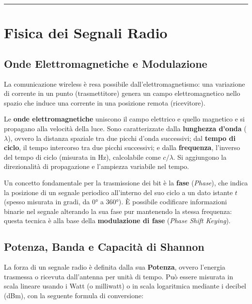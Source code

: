 \documentclass[
  italian,
  openany]{book}
\begin{document}
\begin{center}\rule{0.5\linewidth}{0.5pt}\end{center}

\section{Fisica dei Segnali Radio}\label{fisica-dei-segnali-radio}

\subsection{Onde Elettromagnetiche e
Modulazione}\label{onde-elettromagnetiche-e-modulazione}

La comunicazione wireless è resa possibile dall'elettromagnetismo: una
variazione di corrente in un punto (trasmettitore) genera un campo
elettromagnetico nello spazio che induce una corrente in una posizione
remota (ricevitore).

Le \textbf{onde elettromagnetiche} uniscono il campo elettrico e quello
magnetico e si propagano alla velocità della luce. Sono caratterizzate
dalla \textbf{lunghezza d'onda} (\(\lambda\)), ovvero la distanza
spaziale tra due picchi d'onda successivi; dal \textbf{tempo di ciclo},
il tempo intercorso tra due picchi successivi; e dalla
\textbf{frequenza}, l'inverso del tempo di ciclo (misurata in Hz),
calcolabile come \(c/\lambda\). Si aggiungono la direzionalità di
propagazione e l'ampiezza variabile nel tempo.

Un concetto fondamentale per la trasmissione dei bit è la \textbf{fase}
(\emph{Phase}), che indica la posizione di un segnale periodico
all'interno del suo ciclo a un dato istante \(t\) (spesso misurata in
gradi, da 0° a 360°). È possibile codificare informazioni binarie nel
segnale alterando la sua fase pur mantenendo la stessa frequenza: questa
tecnica è alla base della \textbf{modulazione di fase} (\emph{Phase
Shift Keying}).

\subsection{Potenza, Banda e Capacità di
Shannon}\label{potenza-banda-e-capacituxe0-di-shannon}

La forza di un segnale radio è definita dalla sua \textbf{Potenza},
ovvero l'energia trasmessa o ricevuta dall'antenna per unità di tempo.
Può essere misurata in scala lineare usando i Watt (o milliwatt) o in
scala logaritmica mediante i decibel (dBm), con la seguente formula di
conversione:
\end{document}
